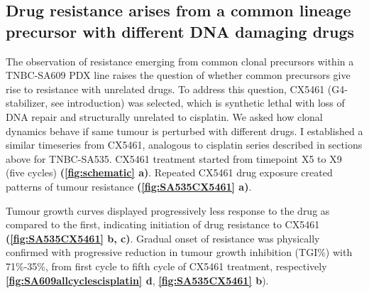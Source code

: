 
\subsection{Drug resistance arises from a common lineage precursor with different DNA damaging drugs}
The observation of resistance emerging from common clonal precursors within a TNBC-SA609 PDX line raises the question of whether common precursors give rise to resistance with unrelated drugs. To address this question, CX5461 (G4-stabilizer, see introduction) was selected, which is synthetic lethal with loss of DNA repair and structurally unrelated to cisplatin. We asked how clonal dynamics behave if same tumour is perturbed with different drugs. 
 I established a similar timeseries from CX5461, analogous to cisplatin series described in sections above for TNBC-SA535. CX5461 treatment started from timepoint X5 to X9 (five cycles) \textbf{(\autoref{fig:schematic} a)}. Repeated CX5461 drug exposure created patterns of tumour resistance  \textbf{(\autoref{fig:SA535CX5461} a)}.
 
Tumour growth curves displayed progressively less response to the drug as compared to the first, indicating initiation of drug resistance to CX5461 \textbf{(\autoref{fig:SA535CX5461} b, c)}. 
Gradual onset of resistance was physically confirmed with progressive reduction in tumour growth inhibition (TGI\%) with 71\%-35\%, from first cycle to fifth cycle of CX5461 treatment, respectively \textbf{\autoref{fig:SA609allcyclescisplatin} d}, \textbf{\autoref{fig:SA535CX5461} b}). 
 


